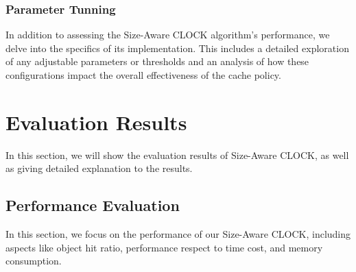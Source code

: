 \documentclass[conference]{IEEEtran}
\begin{document}
\subsubsection{Parameter Tunning}
In addition to assessing the Size-Aware CLOCK algorithm's performance, we delve into the specifics of its implementation. This includes a detailed exploration of any adjustable parameters or thresholds and an analysis of how these configurations impact the overall effectiveness of the cache policy.



\section{Evaluation Results}
In this section, we will show the evaluation results of Size-Aware CLOCK, as well as giving detailed explanation to the results.

\subsection{Performance Evaluation}
In this section, we focus on the performance of our Size-Aware CLOCK, including aspects like object hit ratio, performance respect to time cost, and memory consumption.
\end{document}
